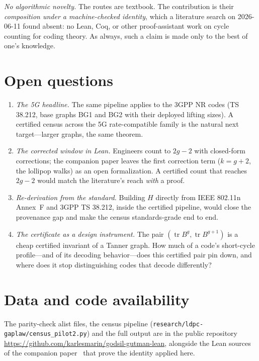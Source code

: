 \documentclass[11pt]{article}
\newcommand{\lean}[1]{\texttt{#1}}
\DeclareMathOperator{\tr}{tr}
\begin{document}
\emph{No algorithmic novelty.} The routes are textbook. The contribution is their
\emph{composition under a machine-checked identity}, which a literature search on 2026-06-11
found absent: no Lean, Coq, or other proof-assistant work on cycle counting for coding theory.
As always, such a claim is made only to the best of one's knowledge.

\section{Open questions}
\label{sec:questions}

\begin{enumerate}
\item \emph{The 5G headline.} The same pipeline applies to the 3GPP NR codes (TS 38.212,
base graphs BG1 and BG2 with their deployed lifting sizes). A certified census across the
5G rate-compatible family is the natural next target---larger graphs, the same theorem.
\item \emph{The corrected window in Lean.} Engineers count to $2g-2$ with closed-form
corrections; the companion paper leaves the first correction term ($k = g+2$, the lollipop
walks) as an open formalization. A certified count that reaches $2g-2$ would match the
literature's reach \emph{with} a proof.
\item \emph{Re-derivation from the standard.} Building $H$ directly from IEEE 802.11n
Annex~F and 3GPP TS 38.212, inside the certified pipeline, would close the provenance gap and
make the census standards-grade end to end.
\item \emph{The certificate as a design instrument.} The pair $(\tr B^g, \tr B^{g+1})$ is a
cheap certified invariant of a Tanner graph. How much of a code's short-cycle profile---and
of its decoding behavior---does this certified pair pin down, and where does it stop
distinguishing codes that decode differently?
\end{enumerate}

\section*{Data and code availability}
The parity-check alist files, the census pipeline
(\lean{research/ldpc-gaplaw/census\_pilot2.py}) and the full output are in the public
repository \url{https://github.com/karlesmarin/godsil-gutman-lean}, alongside the Lean
sources of the companion paper~\cite{MarinGapWindow2026} that prove the identity applied here.
\end{document}
